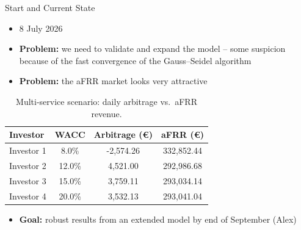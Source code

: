 \documentclass[10pt]{beamer}
\begin{document}
\begin{frame}{Start and Current State}
\vspace{0.2cm}

\begin{itemize}
    \item 8 July 2026
    \item \textbf{Problem:} we need to validate and expand the model -- some suspicion because of the fast convergence of the Gauss--Seidel algorithm
    \item \textbf{Problem:} the aFRR market looks very attractive
\end{itemize}

\vspace{0.3cm}
\small
\begin{table}
    \centering
    \begin{tabular}{lccc}
        \toprule
        \textbf{Investor} & \textbf{WACC} & \textbf{Arbitrage (\euro)} & \textbf{aFRR (\euro)} \\
        \midrule
        Investor 1 & 8.0\%  & -2,574.26 & 332,852.44 \\
        Investor 2 & 12.0\% & 4,521.00  & 292,986.68 \\
        Investor 3 & 15.0\% & 3,759.11  & 293,034.14 \\
        Investor 4 & 20.0\% & 3,532.13  & 293,041.04 \\
        \bottomrule
    \end{tabular}
    \caption{Multi-service scenario: daily arbitrage vs.\ aFRR revenue.}
\end{table}
\vspace{0.2cm}

\begin{itemize}
    \item \textbf{Goal:} robust results from an extended model by end of September (Alex)
\end{itemize}
\end{frame}
\end{document}

